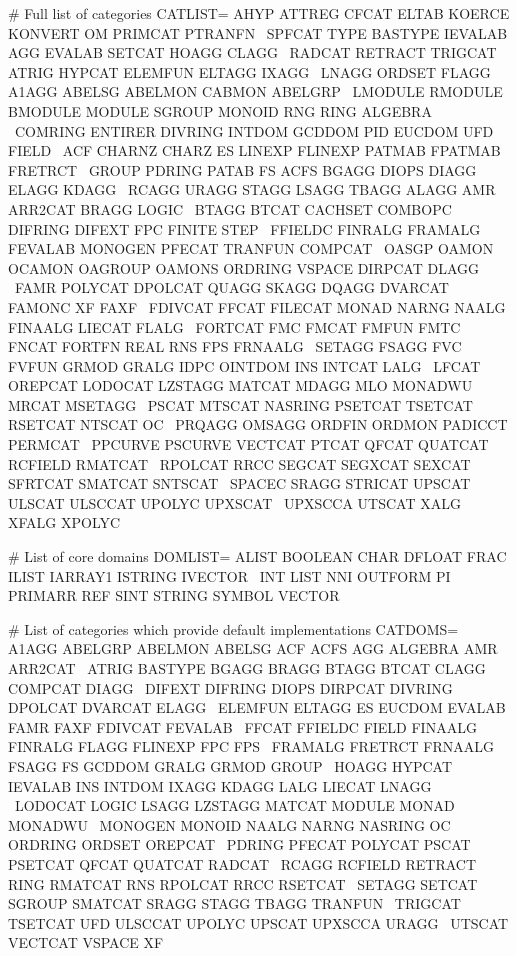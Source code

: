 \documentclass{article}
\begin{document}
# Full list of categories
CATLIST= AHYP ATTREG CFCAT ELTAB KOERCE KONVERT OM PRIMCAT PTRANFN \
        SPFCAT TYPE BASTYPE IEVALAB AGG EVALAB SETCAT HOAGG CLAGG \
        RADCAT RETRACT TRIGCAT ATRIG HYPCAT ELEMFUN ELTAGG IXAGG \
        LNAGG ORDSET FLAGG A1AGG ABELSG ABELMON CABMON ABELGRP \
        LMODULE RMODULE BMODULE MODULE SGROUP MONOID RNG RING ALGEBRA \
        COMRING ENTIRER DIVRING INTDOM GCDDOM PID EUCDOM UFD FIELD \
        ACF CHARNZ CHARZ ES LINEXP FLINEXP PATMAB FPATMAB FRETRCT \
        GROUP PDRING PATAB FS ACFS BGAGG DIOPS DIAGG ELAGG KDAGG \
        RCAGG URAGG STAGG LSAGG TBAGG ALAGG AMR ARR2CAT BRAGG LOGIC \
        BTAGG BTCAT CACHSET COMBOPC DIFRING DIFEXT FPC FINITE STEP \
        FFIELDC FINRALG FRAMALG FEVALAB MONOGEN PFECAT TRANFUN COMPCAT \
        OASGP OAMON OCAMON OAGROUP OAMONS ORDRING VSPACE DIRPCAT DLAGG \
        FAMR POLYCAT DPOLCAT QUAGG SKAGG DQAGG DVARCAT FAMONC XF FAXF \
        FDIVCAT FFCAT FILECAT MONAD NARNG NAALG FINAALG LIECAT FLALG \
        FORTCAT FMC FMCAT FMFUN FMTC FNCAT FORTFN REAL RNS FPS FRNAALG \
        SETAGG FSAGG FVC FVFUN GRMOD GRALG IDPC OINTDOM INS INTCAT LALG \
        LFCAT OREPCAT LODOCAT LZSTAGG MATCAT MDAGG MLO MONADWU MRCAT MSETAGG \
        PSCAT MTSCAT NASRING PSETCAT TSETCAT RSETCAT NTSCAT OC \
        PRQAGG OMSAGG ORDFIN ORDMON PADICCT PERMCAT \
        PPCURVE PSCURVE VECTCAT PTCAT QFCAT QUATCAT RCFIELD RMATCAT \
        RPOLCAT RRCC SEGCAT SEGXCAT SEXCAT SFRTCAT SMATCAT SNTSCAT \
        SPACEC SRAGG STRICAT UPSCAT ULSCAT ULSCCAT UPOLYC UPXSCAT \
        UPXSCCA UTSCAT XALG XFALG XPOLYC


# List of core domains
DOMLIST= ALIST BOOLEAN CHAR DFLOAT FRAC ILIST IARRAY1 ISTRING IVECTOR \
        INT LIST NNI OUTFORM PI PRIMARR REF SINT STRING SYMBOL VECTOR

# List of categories which provide default implementations
CATDOMS= A1AGG ABELGRP ABELMON ABELSG ACF ACFS AGG ALGEBRA AMR ARR2CAT \
        ATRIG BASTYPE BGAGG BRAGG BTAGG BTCAT CLAGG COMPCAT DIAGG \
        DIFEXT DIFRING DIOPS DIRPCAT DIVRING DPOLCAT DVARCAT ELAGG \
        ELEMFUN ELTAGG ES EUCDOM EVALAB FAMR FAXF FDIVCAT FEVALAB \
        FFCAT FFIELDC FIELD FINAALG FINRALG FLAGG FLINEXP FPC FPS \
        FRAMALG FRETRCT FRNAALG FSAGG FS GCDDOM GRALG GRMOD GROUP \
        HOAGG HYPCAT IEVALAB INS INTDOM IXAGG KDAGG LALG LIECAT LNAGG \
        LODOCAT LOGIC LSAGG LZSTAGG MATCAT MODULE MONAD MONADWU \
        MONOGEN MONOID NAALG NARNG NASRING OC ORDRING ORDSET OREPCAT \
        PDRING PFECAT POLYCAT PSCAT PSETCAT QFCAT QUATCAT RADCAT \
        RCAGG RCFIELD RETRACT RING RMATCAT RNS RPOLCAT RRCC RSETCAT \
        SETAGG SETCAT SGROUP SMATCAT SRAGG STAGG TBAGG TRANFUN \
        TRIGCAT TSETCAT UFD ULSCCAT UPOLYC UPSCAT UPXSCCA URAGG \
        UTSCAT VECTCAT VSPACE XF
\end{document}
